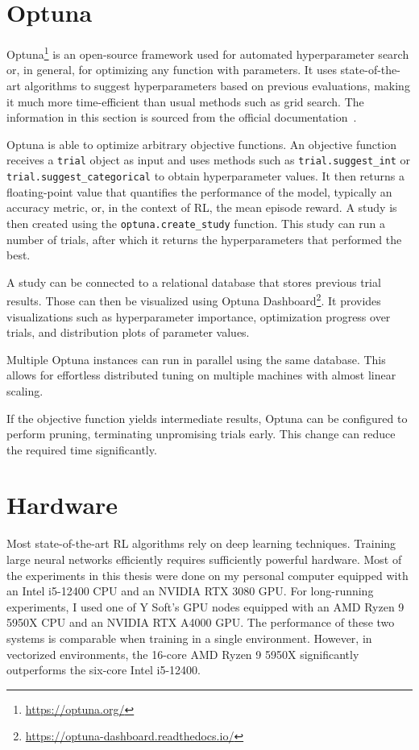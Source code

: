 \documentclass[
  digital,     %
  oneside,     %
  nosansbold,  %
  nocolorbold, %
  lof,         %
  lot,         %
]{fithesis4}
\begin{document}
\section{Optuna}
\label{sec:optuna}

Optuna\footnote{\url{https://optuna.org/}} is an open-source framework used for automated hyperparameter search or, in general, for optimizing any function with parameters. It uses state-of-the-art algorithms to suggest hyperparameters based on previous evaluations, making it much more time-efficient than usual methods such as grid search. The information in this section is sourced from the official documentation~\cite{optuna-docs}.

Optuna is able to optimize arbitrary objective functions. An objective function receives a \texttt{trial} object as input and uses methods such as \texttt{trial.suggest\_int} or \texttt{trial.suggest\_categorical} to obtain hyperparameter values. It then returns a floating-point value that quantifies the performance of the model, typically an accuracy metric, or, in the context of RL, the mean episode reward. A study is then created using the \texttt{optuna.create\_study} function. This study can run a number of trials, after which it returns the hyperparameters that performed the best.

A study can be connected to a relational database that stores previous trial results. Those can then be visualized using Optuna Dashboard\footnote{\url{https://optuna-dashboard.readthedocs.io/}}. It provides visualizations such as hyperparameter importance, optimization progress over trials, and distribution plots of parameter values.

Multiple Optuna instances can run in parallel using the same database. This allows for effortless distributed tuning on multiple machines with almost linear scaling.

If the objective function yields intermediate results, Optuna can be configured to perform pruning, terminating unpromising trials early. This change can reduce the required time significantly.

\section{Hardware}

Most state-of-the-art RL algorithms rely on deep learning techniques. Training large neural networks efficiently requires sufficiently powerful hardware. Most of the experiments in this thesis were done on my personal computer equipped with an Intel i5-12400 CPU and an NVIDIA RTX 3080 GPU. For long-running experiments, I used one of Y Soft's GPU nodes equipped with an AMD Ryzen 9 5950X CPU and an NVIDIA RTX A4000 GPU. The performance of these two systems is comparable when training in a single environment. However, in vectorized environments, the 16-core AMD Ryzen 9 5950X significantly outperforms the six-core Intel i5-12400.
\end{document}
